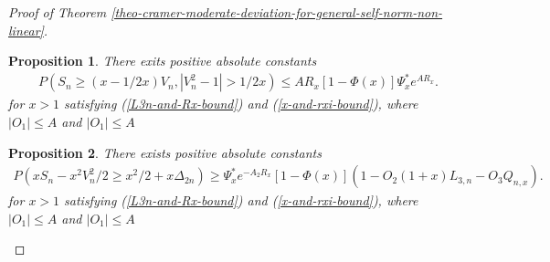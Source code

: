 \documentclass[bj,authoryear]{imsart}
\numberwithin{equation}{section}
\theoremstyle{plain}
\newtheorem{prop}{Proposition}[section]
\theoremstyle{definition}
\begin{document}
\begin{proof}[Proof of Theorem \ref{theo-cramer-moderate-deviation-for-general-self-norm-non-linear}]
\begin{prop}\label{proposition A2}
There exits positive absolute constants  
\begin{align}
  P(S_n\geq (x-1/2x)V_n,|V_{n}^{2}-1|>1/2x)\leq AR_x[1-\Phi(x)]\Psi_{x}^{*}e^{AR_x}.
\end{align}
for $x>1$ satisfying (\ref{L3n-and-Rx-bound}) and (\ref{x-and-rxi-bound}), where $|O_1| \leq A$ and $|O_{1}|\leq A$
\end{prop}

\begin{prop}\label{proposition B1}
There exists positive absolute constants  
\begin{align}
  P(xS_n-x^2V_{n}^{2}/2\geq x^2/2+x\Delta_{2n})\geq \Psi_{x}^{*}e^{-A_2R_x}[1-\Phi(x)](1-O_2(1+x)L_{3,n}-O_3Q_{n,x}).
\end{align}
for $x>1$ satisfying (\ref{L3n-and-Rx-bound}) and (\ref{x-and-rxi-bound}), where $|O_1| \leq A$ and $|O_{1}|\leq A$
\end{prop}

\end{proof}
\end{document}
